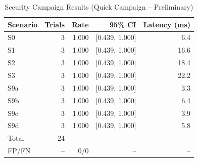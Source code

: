 \begin{table}[htbp]
\caption{Security Campaign Results (Quick Campaign -- Preliminary)}
\label{tab:security-results}
\centering
\small
\begin{tabular}{lrrrr}
\toprule
\textbf{Scenario} & \textbf{Trials} & \textbf{Rate} & \textbf{95\% CI} & \textbf{Latency (ms)} \\
\midrule
  S0 & 3 & 1.000 & [0.439, 1.000] & 6.4 \\
  S1 & 3 & 1.000 & [0.439, 1.000] & 16.6 \\
  S2 & 3 & 1.000 & [0.439, 1.000] & 18.4 \\
  S3 & 3 & 1.000 & [0.439, 1.000] & 22.2 \\
  S9a & 3 & 1.000 & [0.439, 1.000] & 3.3 \\
  S9b & 3 & 1.000 & [0.439, 1.000] & 6.4 \\
  S9c & 3 & 1.000 & [0.439, 1.000] & 3.9 \\
  S9d & 3 & 1.000 & [0.439, 1.000] & 5.8 \\
\midrule
  Total & 24 & -- & -- & -- \\
  FP/FN & -- & 0/0 & -- & -- \\
\bottomrule
\end{tabular}
\end{table}